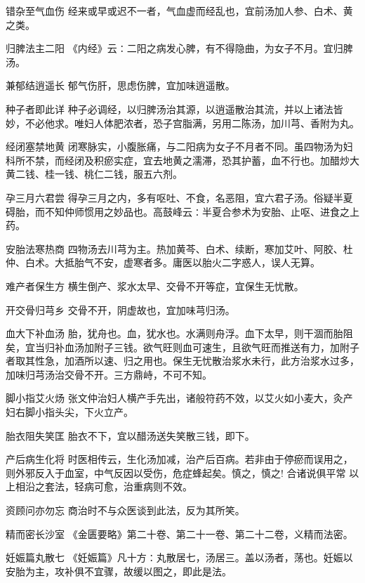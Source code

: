 \documentclass[a4paper,12pt,UTF8,twoside]{ctexbook}
\begin{document}
    错杂至气血伤
    经来或早或迟不一者，气血虚而经乱也，宜前汤加人参、白术、黄之类。
    
    归脾法主二阳
    《内经》云∶二阳之病发心脾，有不得隐曲，为女子不月。宜归脾汤。
    
    兼郁结逍遥长
    郁气伤肝，思虑伤脾，宜加味逍遥散。
    
    种子者即此详
    种子必调经，以归脾汤治其源，以逍遥散治其流，并以上诸法皆妙，不必他求。唯妇人体肥浓者，恐子宫脂满，另用二陈汤，加川芎、香附为丸。
    
    经闭塞禁地黄
    闭寒脉实，小腹胀痛，与二阳病为女子不月者不同。虽四物汤为妇科所不禁，而经闭及积瘀实症，宜去地黄之濡滞，恐其护蓄，血不行也。加醋炒大黄二钱、桂一钱、桃仁二钱，服五六剂。
    
    孕三月六君尝
    得孕三月之内，多有呕吐、不食，名恶阻，宜六君子汤。俗疑半夏碍胎，而不知仲师惯用之妙品也。高鼓峰云∶半夏合参术为安胎、止呕、进食之上药。
    
    安胎法寒热商
    四物汤去川芎为主。热加黄芩、白术、续断，寒加艾叶、阿胶、杜仲、白术。大抵胎气不安，虚寒者多。庸医以胎火二字惑人，误人无算。
    
    难产者保生方
    横生倒产、浆水太早、交骨不开等症，宜保生无忧散。
    
    开交骨归芎乡
    交骨不开，阴虚故也，宜加味芎归汤。
    
    血大下补血汤
    胎，犹舟也。血，犹水也。水满则舟浮。血下太早，则干涸而胎阻矣，宜当归补血汤加附子三钱。欲气旺则血可速生，且欲气旺而推送有力，加附子者取其性急，加酒所以速、归之用也。保生无忧散治浆水未行，此方治浆水过多，加味归芎汤治交骨不开。三方鼎峙，不可不知。
    
    脚小指艾火炀
    张文仲治妇人横产手先出，诸般符药不效，以艾火如小麦大，灸产妇右脚小指头尖，下火立产。
    
    胎衣阻失笑匡
    胎衣不下，宜以醋汤送失笑散三钱，即下。
    
    产后病生化将
    时医相传云，生化汤加减，治产后百病。若非由于停瘀而误用之，则外邪反入于血室，中气反因以受伤，危症蜂起矣。慎之，慎之!
    合诸说俱平常
    以上相沿之套法，轻病可愈，治重病则不效。
    
    资顾问亦勿忘
    商治时不与众医谈到此法，反为其所笑。
    
    精而密长沙室
    《金匮要略》第二十卷、第二十一卷、第二十二卷，义精而法密。
    
    妊娠篇丸散七
    《妊娠篇》凡十方∶丸散居七，汤居三。盖以汤者，荡也。妊娠以安胎为主，攻补俱不宜骤，故缓以图之，即此是法。
    
\end{document}
